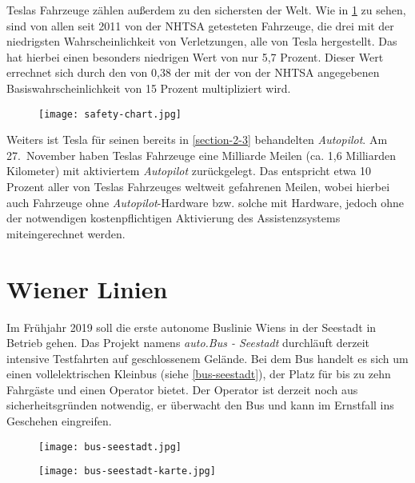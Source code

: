 Teslas Fahrzeuge zählen außerdem zu den sichersten der Welt. Wie in \ref{safety-chart} zu sehen, sind von allen seit 2011 von der \ac{NHTSA} getesteten Fahrzeuge, die drei mit der niedrigsten Wahrscheinlichkeit von Verletzungen, alle von Tesla hergestellt. Das  hat hierbei einen besonders niedrigen Wert von nur 5,7 Prozent. Dieser Wert errechnet sich durch den  von 0,38 der mit der von der \ac{NHTSA} angegebenen Basiswahrscheinlichkeit von 15 Prozent multipliziert wird. 

\begin{figure}\centering
  \texttt{[image: safety-chart.jpg]}
  \label{safety-chart}
\end{figure}

Weiters ist Tesla für seinen bereits in \ref{section-2-3} behandelten \textit{Autopilot}. Am 27.\ November haben Teslas Fahrzeuge eine Milliarde Meilen (ca. 1,6 Milliarden Kilometer) mit aktiviertem \textit{Autopilot} zurückgelegt. Das entspricht etwa 10 Prozent aller von Teslas Fahrzeuges weltweit gefahrenen Meilen, wobei hierbei auch Fahrzeuge ohne \textit{Autopilot}-Hardware bzw. solche mit Hardware, jedoch ohne der notwendigen kostenpflichtigen Aktivierung des Assistenzsystems miteingerechnet werden. 


\section{Wiener Linien}

Im Frühjahr 2019 soll die erste autonome Buslinie Wiens in der Seestadt in Betrieb gehen. Das Projekt namens \textit{auto.Bus - Seestadt} durchläuft derzeit intensive Testfahrten auf geschlossenem Gelände. Bei dem Bus handelt es sich um einen vollelektrischen Kleinbus (siehe \ref{bus-seestadt}), der Platz für bis zu zehn Fahrgäste und einen Operator bietet. Der Operator ist derzeit noch aus sicherheitsgründen notwendig, er überwacht den Bus und kann im Ernstfall ins Geschehen eingreifen. 

\begin{figure}\centering
  \texttt{[image: bus-seestadt.jpg]}
  \label{bus-seestadt}

  \texttt{[image: bus-seestadt-karte.jpg]}
  \label{bus-seestadt-karte}
\end{figure}


